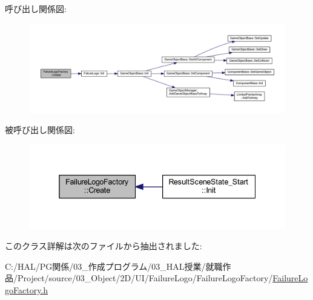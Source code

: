 呼び出し関係図\+:\nopagebreak
\begin{figure}[H]
\begin{center}
\leavevmode
\includegraphics[width=350pt]{class_failure_logo_factory_a623d73668a89fceca9dc013112b4c8a3_cgraph}
\end{center}
\end{figure}
被呼び出し関係図\+:\nopagebreak
\begin{figure}[H]
\begin{center}
\leavevmode
\includegraphics[width=338pt]{class_failure_logo_factory_a623d73668a89fceca9dc013112b4c8a3_icgraph}
\end{center}
\end{figure}


このクラス詳解は次のファイルから抽出されました\+:\begin{DoxyCompactItemize}
\item 
C\+:/\+H\+A\+L/\+P\+G関係/03\+\_\+作成プログラム/03\+\_\+\+H\+A\+L授業/就職作品/\+Project/source/03\+\_\+\+Object/2\+D/\+U\+I/\+Failure\+Logo/\+Failure\+Logo\+Factory/\mbox{\hyperlink{_failure_logo_factory_8h}{Failure\+Logo\+Factory.\+h}}\end{DoxyCompactItemize}
